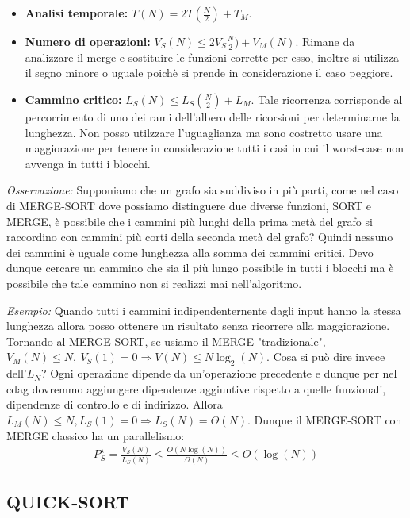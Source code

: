 \documentclass[a4paper,portrait,12pt]{article}
\theoremstyle{definition}
\begin{document}
\begin{itemize}
\item \textbf{Analisi temporale:} $T(N) = 2T(\frac{N}{2}) + T_M$.
\item \textbf{Numero di operazioni:} $V_S(N) \le 2V_S\frac{N}{2}) + V_M(N)$. Rimane da analizzare il merge e sostituire le funzioni corrette per esso, inoltre si utilizza il segno minore o uguale poichè si prende in considerazione il caso peggiore.
\item \textbf{Cammino critico:} $L_S(N) \le L_S(\frac{N}{2}) + L_M$. Tale ricorrenza corrisponde al percorrimento di uno dei rami dell’albero delle ricorsioni per determinarne la lunghezza.
Non posso utilzzare l’uguaglianza ma sono costretto usare una maggiorazione per tenere in considerazione tutti i casi in cui il worst-case non avvenga in tutti i blocchi.
\end{itemize}

\textit{Osservazione:} Supponiamo che un grafo sia suddiviso in più parti, come nel caso di MERGE-SORT dove possiamo distinguere due diverse funzioni, SORT e MERGE, è possibile che i cammini più lunghi della prima metà del grafo si raccordino con cammini più corti della seconda metà del grafo?
Quindi nessuno dei cammini è uguale come lunghezza alla somma dei cammini critici.
Devo dunque cercare un cammino che sia il più lungo possibile in tutti i blocchi ma è possibile che tale cammino non si realizzi mai nell’algoritmo.

\textit{Esempio:} Quando tutti i cammini indipendenternente dagli input hanno la stessa lunghezza allora posso ottenere un risultato senza ricorrere alla maggiorazione.\\

Tornando al MERGE-SORT, se usiamo il MERGE "tradizionale", $V_M(N) \le N,\ V_S(1) = 0 \Rightarrow V(N) \le N \log_2(N)$.
Cosa si può dire invece dell’$L_N$?
Ogni operazione dipende da un’operazione precedente e dunque per nel cdag dovremmo aggiungere dipendenze aggiuntive rispetto a quelle funzionali, dipendenze di controllo e di indirizzo.
Allora $L_M(N) \le N, L_S(1) = 0 \Rightarrow L_S(N) = \Theta(N)$.
Dunque il MERGE-SORT con MERGE classico ha un parallelismo:
\begin{align*}
P^{\star}_S = \frac{V_S(N)}{L_S(N)} \le \frac{O(N \log(N))}{\Omega(N)} \le O(\log(N))
\end{align*}


\subsection{QUICK-SORT}
\end{document}
